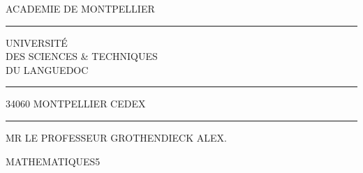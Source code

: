 \begin{center}
ACADEMIE DE MONTPELLIER\\
\rule{2cm}{0.4pt}

UNIVERSITÉ\\
DES SCIENCES \& TECHNIQUES\\
DU LANGUEDOC\\
\rule{2cm}{0.4pt}

34060 MONTPELLIER CEDEX\\
\rule{2cm}{0.4pt}
\end{center}

MR LE PROFESSEUR GROTHENDIECK ALEX.

MATHEMATIQUES\hfill 5

